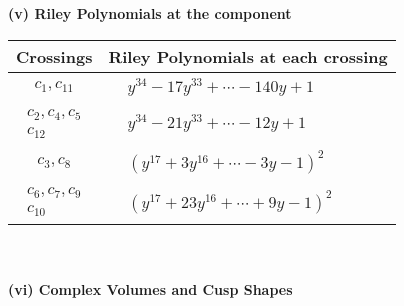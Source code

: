 \documentclass[1p]{elsarticle_modified}
\theoremstyle{definition}
\begin{document}
\newpage\renewcommand{\arraystretch}{1}
\flushleft \textbf{(v) Riley Polynomials at the component}\newline \\
\begin{tabular}{m{50pt}|m{274pt}}
Crossings & \hspace{64pt}Riley Polynomials at each crossing \\
\hline $$\begin{aligned}c_{1},c_{11}\end{aligned}$$&$\begin{aligned}
&y^{34}-17 y^{33}+\cdots-140 y+1
\end{aligned}$\\
\hline $$\begin{aligned}c_{2},c_{4},c_{5}\\c_{12}\end{aligned}$$&$\begin{aligned}
&y^{34}-21 y^{33}+\cdots-12 y+1
\end{aligned}$\\
\hline $$\begin{aligned}c_{3},c_{8}\end{aligned}$$&$\begin{aligned}
&(y^{17}+3 y^{16}+\cdots-3 y-1)^{2}
\end{aligned}$\\
\hline $$\begin{aligned}c_{6},c_{7},c_{9}\\c_{10}\end{aligned}$$&$\begin{aligned}
&(y^{17}+23 y^{16}+\cdots+9 y-1)^{2}
\end{aligned}$\\
\hline
\end{tabular}\\~\\
\newpage\flushleft \textbf{(vi) Complex Volumes and Cusp Shapes}
\end{document}
